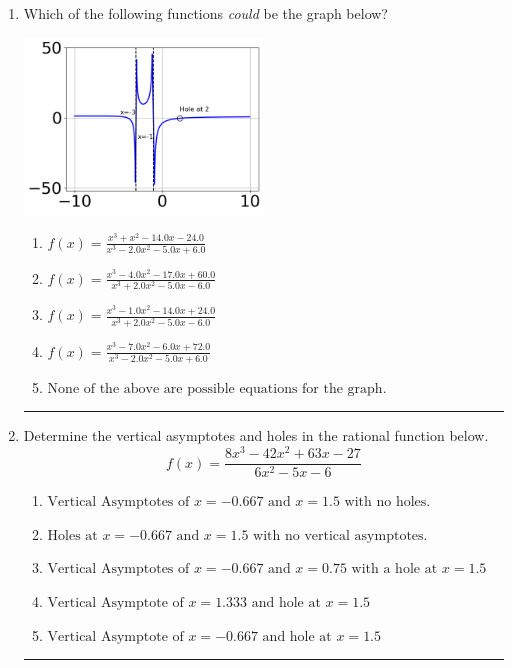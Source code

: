 \documentclass[14pt]{extbook}
\newcommand{\litem}[1]{\item#1\hspace*{-1cm}\rule{\textwidth}{0.4pt}}
\begin{document}
\begin{enumerate}
{\begin{enumerate}[label=\Alph*.]
\end{enumerate} }
\litem{
Which of the following functions \textit{could} be the graph below?
\begin{center}
    \includegraphics[width=0.5\textwidth]{../Figures/identifyGraphOfRationalFunctionCopyB.png}
\end{center}
\begin{enumerate}[label=\Alph*.]
\item \( f(x)=\frac{x^{3} + x^{2} -14.0 x -24.0}{x^{3} -2.0 x^{2} -5.0 x + 6.0} \)
\item \( f(x)=\frac{x^{3} -4.0 x^{2} -17.0 x + 60.0}{x^{3} +2.0 x^{2} -5.0 x -6.0} \)
\item \( f(x)=\frac{x^{3} -1.0 x^{2} -14.0 x + 24.0}{x^{3} +2.0 x^{2} -5.0 x -6.0} \)
\item \( f(x)=\frac{x^{3} -7.0 x^{2} -6.0 x + 72.0}{x^{3} -2.0 x^{2} -5.0 x + 6.0} \)
\item \( \text{None of the above are possible equations for the graph.} \)

\end{enumerate} }
\litem{
Determine the vertical asymptotes and holes in the rational function below.\[ f(x) = \frac{8x^{3} -42 x^{2} +63 x -27}{6x^{2} -5 x -6} \]\begin{enumerate}[label=\Alph*.]
\item \( \text{Vertical Asymptotes of } x = -0.667 \text{ and } x = 1.5 \text{ with no holes.} \)
\item \( \text{Holes at } x = -0.667 \text{ and } x = 1.5 \text{ with no vertical asymptotes.} \)
\item \( \text{Vertical Asymptotes of } x = -0.667 \text{ and } x = 0.75 \text{ with a hole at } x = 1.5 \)
\item \( \text{Vertical Asymptote of } x = 1.333 \text{ and hole at } x = 1.5 \)
\item \( \text{Vertical Asymptote of } x = -0.667 \text{ and hole at } x = 1.5 \)


\end{enumerate}}
\end{enumerate}
\end{document}
